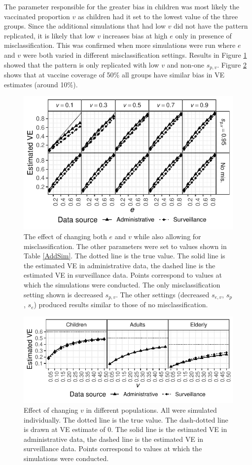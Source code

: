 \documentclass[11pt]{article}
\begin{document}
The parameter responsible for the greater bias in children was most likely the vaccinated proportion $v$ as children had it set to the lowest value of the three groups. Since the additional simulations that had low $v$ did not have the pattern replicated, it is likely that low $v$ increases bias at high $e$ only in presence of misclassification. This was confirmed when more simulations were run where $e$ and $v$ were both varied in different misclassification settings. Results in Figure \ref{veinv-summ} showed that the pattern is only replicated with low $v$ and non-one $s_{p,v}$. Figure \ref{agesind-pvac} shows that at vaccine coverage of 50\% all groups have similar bias in VE estimates (around 10\%).

\pagebreak

\begin{figure}[H]
	\centering
		\includegraphics[width=0.85\linewidth]{../fig-veinv/veinv-limited.pdf}
		\caption{
The effect of changing both $e$ and $v$ while also allowing for misclassification. The other parameters were set to values shown in Table \ref{AddSim}. The dotted line is the true value. The solid line is the estimated VE in administrative data, the dashed line is the estimated VE in surveillance data. Points correspond to values at which the simulations were conducted.  The only misclassification setting shown is decreased $s_{p,v}$. The other settings (decreased $s_{e,v}$,  $s_p$, $s_e$) produced results similar to those of no misclassification. \label{veinv-summ}
		}	
\end{figure}

\begin{figure}[h]
	\centering
		\includegraphics[width=0.75\linewidth]{../fig-agesind/agesind-pvac.pdf}
		\caption{
Effect of changing $v$ in different populations. All were simulated individually. The dotted line is the true value. The dash-dotted line is drawn at VE estimate of 0. The solid line is the estimated VE in administrative data, the dashed line is the estimated VE in surveillance data. Points correspond to values at which the simulations were conducted.  \label{agesind-pvac}
		}
\end{figure}
\end{document}
